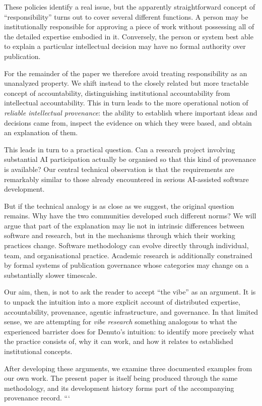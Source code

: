 These policies identify a real issue, but the apparently straightforward concept of ``responsibility'' turns out to cover several different functions. A person may be institutionally responsible for approving a piece of work without possessing all of the detailed expertise embodied in it. Conversely, the person or system best able to explain a particular intellectual decision may have no formal authority over publication.

For the remainder of the paper we therefore avoid treating responsibility as an unanalyzed property. We shift instead to the closely related but more tractable concept of accountability, distinguishing institutional accountability from intellectual accountability. This in turn leads to the more operational notion of \emph{reliable intellectual provenance}: the ability to establish where important ideas and decisions came from, inspect the evidence on which they were based, and obtain an explanation of them.

This leads in turn to a practical question. Can a research project involving substantial AI participation actually be organised so that this kind of provenance is available? Our central technical observation is that the requirements are remarkably similar to those already encountered in serious AI-assisted software development.

But if the technical analogy is as close as we suggest, the original question remains. Why have the two communities developed such different norms? We will argue that part of the explanation may lie not in intrinsic differences between software and research, but in the mechanisms through which their working practices change. Software methodology can evolve directly through individual, team, and organisational practice. Academic research is additionally constrained by formal systems of publication governance whose categories may change on a substantially slower timescale.

Our aim, then, is not to ask the reader to accept ``the vibe'' as an argument. It is to unpack the intuition into a more explicit account of distributed expertise, accountability, provenance, agentic infrastructure, and governance. In that limited sense, we are attempting for \emph{vibe research} something analogous to what the experienced barrister does for Denuto's intuition: to identify more precisely what the practice consists of, why it can work, and how it relates to established institutional concepts.

After developing these arguments, we examine three documented examples from our own work. The present paper is itself being produced through the same methodology, and its development history forms part of the accompanying provenance record.
```
